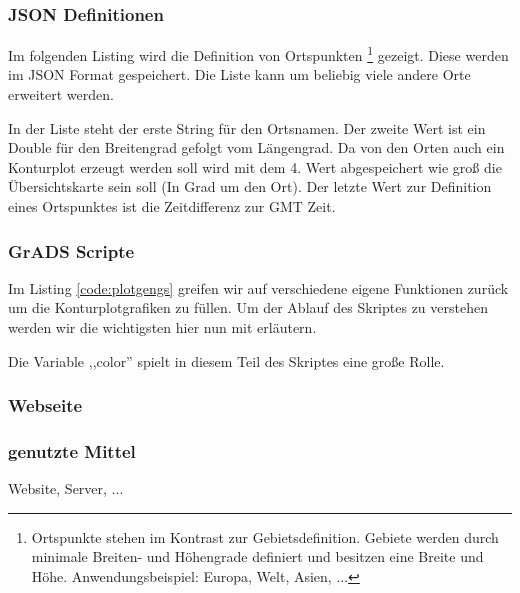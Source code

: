 \documentclass[a4paper,oneside,12pt,titlepage]{article}
\newcommand{\pyvidir}{../../Code/PyVi/}	%
\begin{document}
\subsubsection*{JSON Definitionen}
Im folgenden Listing wird die Definition von Ortspunkten
\footnote{Ortspunkte stehen im Kontrast zur Gebietsdefinition. Gebiete werden durch minimale Breiten- und Höhengrade definiert und besitzen eine Breite und Höhe. Anwendungsbeispiel: Europa, Welt, Asien, ...} gezeigt. Diese werden im JSON Format gespeichert. Die Liste kann um beliebig viele andere Orte erweitert werden.

In der Liste steht der erste String für den Ortsnamen. Der zweite Wert ist ein Double für den Breitengrad gefolgt vom Längengrad. Da von den Orten auch ein Konturplot erzeugt werden soll wird mit dem 4. Wert abgespeichert wie groß die Übersichtskarte sein soll (In Grad um den Ort). Der letzte Wert zur Definition eines Ortspunktes ist die Zeitdifferenz zur GMT Zeit.

\subsubsection*{GrADS Scripte}


Im Listing \ref{code:plotgengs} greifen wir auf verschiedene eigene Funktionen zurück um die Konturplotgrafiken zu füllen. Um der Ablauf des Skriptes zu verstehen werden wir die wichtigsten hier nun mit erläutern.

Die Variable ,,color'' spielt in diesem Teil des Skriptes eine große Rolle.

\subsubsection*{Webseite}

\subsubsection{genutzte Mittel} %
Website, Server, ...
\end{document}
